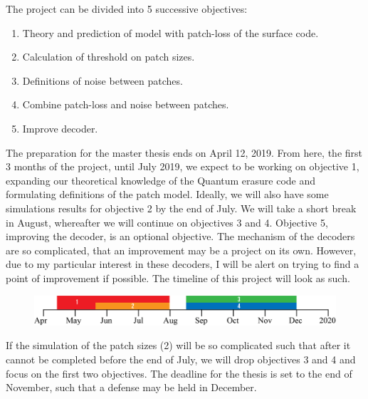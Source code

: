 \noindent
The project can be divided into 5 successive objectives:
\begin{enumerate}\label{test}
  \item Theory and prediction of model with patch-loss of the surface code.
  \item Calculation of threshold on patch sizes.
  \item Definitions of noise between patches.
  \item Combine patch-loss and noise between patches.
  \item Improve decoder.
\end{enumerate}
The preparation for the master thesis ends on April 12, 2019. From here, the first 3 months of the project, until July 2019, we expect to be working on objective 1, expanding our theoretical knowledge of the Quantum erasure code and formulating definitions of the patch model. Ideally, we will also have some simulations results for objective 2 by the end of July. We will take a short break in August, whereafter we will continue on objectives 3 and 4. Objective 5, improving the decoder, is an optional objective. The mechanism of the decoders are so complicated, that an improvement may be a project on its own. However, due to my particular interest in these decoders, I will be alert on trying to find a point of improvement if possible. The timeline of this project will look as such.
\begin{figure}[htpb]
  \centering
  \includegraphics[width=\linewidth]{fig/Timeline.png}
\end{figure}

If the simulation of the patch sizes (2) will be so complicated such that after it cannot be completed before the end of July, we will drop objectives 3 and 4 and focus on the first two objectives. The deadline for the thesis is set to the end of November, such that a defense may be held in December.



